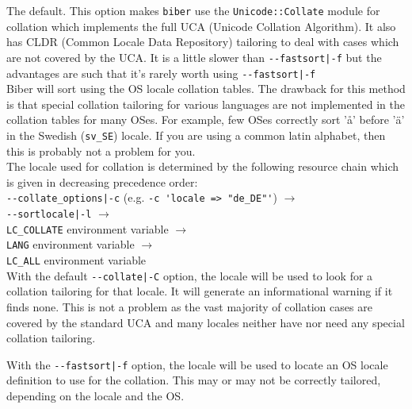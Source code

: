 \documentclass{ltxdockit}
\def\biberex#1{\hbox{\hspace{-4em}\texttt{\small \detokenize{#1}}}}
\begin{document}
\biberex{--collate|-C}
  \noindent The default. This option makes \verb+biber+ use the
  \verb+Unicode::Collate+ module for collation which implements the full UCA (Unicode
  Collation Algorithm). It also has CLDR (Common Locale Data
  Repository) tailoring to deal with cases which are not covered by the
  UCA. It is a little slower than \verb+--fastsort|-f+ but the
  advantages are such that it's rarely worth using \verb+--fastsort|-f+\\[1ex]

\biberex{--fastsort|-f}
  \noindent Biber will sort using
  the OS locale collation tables. The drawback for this method is that special
  collation tailoring for various languages are not implemented in the
  collation tables for many OSes. For example, few OSes correctly sort 'å'
  before 'ä' in the Swedish (\verb+sv_SE+) locale. If you are using a
  common latin alphabet, then this is probably not a problem for you.\\[2ex]

\noindent The locale used for collation is determined by the following resource
chain which is given in decreasing precedence order:\\[2ex]

\noindent\verb+--collate_options|-c+ (e.g. \verb+-c 'locale => "de_DE"'+) $\rightarrow$\\
\hspace*{1em}\verb+--sortlocale|-l+ $\rightarrow$\\
\hspace*{2em}\verb+LC_COLLATE+ environment variable $\rightarrow$\\
\hspace*{3em}\verb+LANG+ environment variable $\rightarrow$\\
\hspace*{4em}\verb+LC_ALL+ environment variable\\[2ex]

\noindent With the default \verb+--collate|-C+ option, the locale will
be used to look for a collation tailoring for that locale. It will generate an
informational warning if it finds none. This is not a problem as the vast
majority of collation cases are covered by the standard UCA and many
locales neither have nor need any special collation tailoring.

With the \verb+--fastsort|-f+ option, the locale will be
used to locate an OS locale definition to use for the collation. This
may or may not be correctly tailored, depending on the locale and the OS.\\[1ex]
\end{document}
